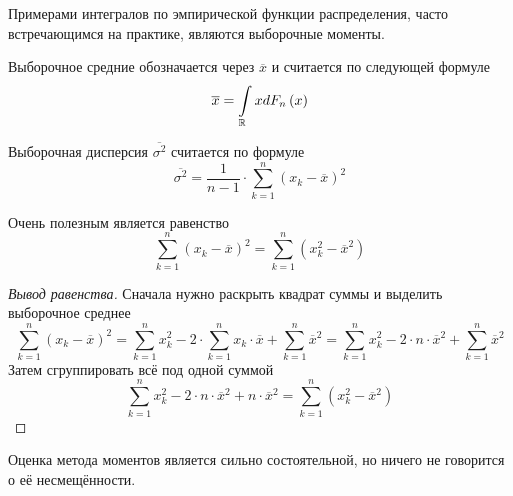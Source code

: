 Примерами интегралов по эмпирической функции распределения, часто встречающимся
на практике, являются выборочные моменты.

\begin{definition}
  Выборочное средние обозначается через $\overline{x}$
  и считается по следующей формуле
  \begin{equation*}
    \overline{x} = \int\limits_{\mathbb{R}}xdF_n\left(x\right)
  \end{equation*}
\end{definition}

\begin{definition}
  Выборочная дисперсия $\overline{\sigma^2}$
  считается по формуле
  \begin{equation*}
    \overline{\sigma^2}
    = \frac{1}{n-1} \cdot \sum_{k=1}^n \left( x_k-\overline{x} \right)^2
  \end{equation*}
\end{definition}

\begin{remark}
  Очень полезным является равенство
  \begin{equation*}
    \sum_{k=1}^{n} \left( x_k - \overline{x} \right)^2
    = \sum_{k=1}^{n} \left( x_k^2 - \overline{x}^2 \right)
  \end{equation*}
\end{remark}
\begin{proof}[Вывод равенства]
  Сначала нужно раскрыть квадрат суммы и выделить выборочное среднее
  \begin{equation*}
    \sum_{k=1}^{n} \left( x_k - \overline{x} \right)^2
    = \sum_{k=1}^{n} x_k^2 - 2 \cdot \sum_{k=1}^{n} x_k \cdot \overline{x}
      + \sum_{k=1}^{n} \overline{x}^2
    = \sum_{k=1}^{n} x_k^2 - 2 \cdot n \cdot \overline{x}^2
      + \sum_{k=1}^{n} \overline{x}^2
  \end{equation*}
  Затем сгруппировать всё под одной суммой
  \begin{equation*}
    \sum_{k=1}^{n} x_k^2 - 2 \cdot n \cdot \overline{x}^2
      + n \cdot \overline{x}^2
    = \sum_{k=1}^{n} \left( x_k^2 - \overline{x}^2 \right)
  \end{equation*}
\end{proof}

\begin{remark}
  Оценка метода моментов является сильно состоятельной, но ничего не говорится
  о её несмещённости.
\end{remark}

